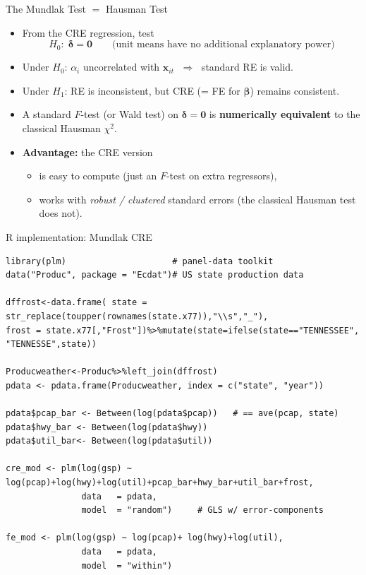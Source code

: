 \documentclass[aspectratio=169, handout, t]{beamer}
\numberwithin{equation}{section}
\begin{document}
\begin{frame}{The Mundlak Test $=$ Hausman Test}
\begin{itemize}
  \item From the CRE regression, test
    \[
      H_0\!:\; \bm{\delta} = \bm{0}
      \qquad\text{(unit means have no additional explanatory power)}
    \]
  \item Under $H_0$: $\alpha_i$ uncorrelated with $\bm{x}_{it}$
        $\;\Rightarrow\;$ standard RE is valid.
  \item Under $H_1$: RE is inconsistent, but CRE (= FE for $\bm{\beta}$)
        remains consistent.\pause
  \item A standard $F$-test (or Wald test) on $\bm{\delta}=\bm{0}$ is
        \textbf{numerically equivalent} to the classical Hausman $\chi^2$.
  \item \textbf{Advantage:} the CRE version
    \begin{itemize}
      \item is easy to compute (just an $F$-test on extra regressors),
      \item works with \emph{robust / clustered} standard errors
            (the classical Hausman test does not).
    \end{itemize}
\end{itemize}
\end{frame}

\begin{frame}[fragile]{R implementation: Mundlak CRE}
\begin{lstlisting}
library(plm)                     # panel-data toolkit
data("Produc", package = "Ecdat")# US state production data

dffrost<-data.frame( state = str_replace(toupper(rownames(state.x77)),"\\s","_"),
frost = state.x77[,"Frost"])%>%mutate(state=ifelse(state=="TENNESSEE", "TENNESSE",state))

Producweather<-Produc%>%left_join(dffrost)
pdata <- pdata.frame(Producweather, index = c("state", "year"))

pdata$pcap_bar <- Between(log(pdata$pcap))   # == ave(pcap, state)
pdata$hwy_bar <- Between(log(pdata$hwy))
pdata$util_bar<- Between(log(pdata$util))

cre_mod <- plm(log(gsp) ~ log(pcap)+log(hwy)+log(util)+pcap_bar+hwy_bar+util_bar+frost,
               data   = pdata,
               model  = "random")     # GLS w/ error-components

fe_mod <- plm(log(gsp) ~ log(pcap)+ log(hwy)+log(util),
               data   = pdata,
               model  = "within")  
               
\end{lstlisting}
\end{frame}
\end{document}
